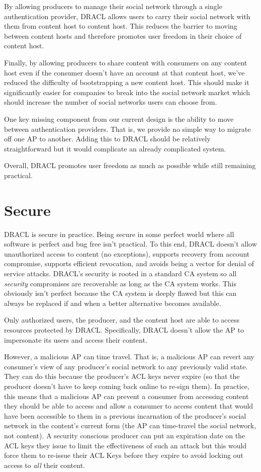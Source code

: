 \documentclass[pdftex,12pt,a4papaer,twoside,notitlepage]{report}
\begin{document}
By allowing producers to manage their social network through a single
authentication provider, DRACL allows users to carry their social network with
them from content host to content host. This reduces the barrier to moving
between content hosts and therefore promotes user freedom in their choice of
content host.

Finally, by allowing producers to share content with consumers on any content
host even if the consumer doesn't have an account at that content host, we've
reduced the difficulty of bootstrapping a new content host. This should make it
significantly easier for companies to break into the social network market which
should increase the number of social networks users can choose from.

One key missing component from our current design is the ability to move between
authentication providers. That is, we provide no simple way to migrate off one
AP to another. Adding this to DRACL should be relatively straightforward but it
would complicate an already complicated system.

Overall, DRACL promotes user freedom as much as possible while still remaining
practical.

\section{Secure}
\label{sec:secure}

DRACL is secure in practice. Being secure in some perfect world where all
software is perfect and bug free isn't practical. To this end, DRACL doesn't
allow unauthorized access to content (no exceptions), supports recovery from
account compromise, supports efficient revocation, and avoids being a vector for
denial of service attacks. DRACL's security is rooted in a standard CA system so
all \emph{security} compromises are recoverable as long as the CA system works.
This obviously isn't perfect because the CA system is deeply flawed but this can
always be replaced if and when a better alternative becomes available.

Only authorized users, the producer, and the content host are able to access
resources protected by DRACL\@. Specifically, DRACL doesn't allow the AP to
impersonate its users and access their content.

However, a malicious AP can time travel. That is, a malicious AP can revert any
consumer's view of any producer's social network to any previously valid state.
They can do this because the producer's ACL keys never expire (so that the
producer doesn't have to keep coming back online to re-sign them). In practice,
this means that a malicious AP can prevent a consumer from accessing content
they should be able to access and allow a consumer to access content that would
have been accessible to them in a previous incarnation of the producer's social
network in the content's current form (the AP can time-travel the social network,
not content). A security conscious producer can put an expiration date on
the ACL keys they issue to limit the effectiveness of such an attack but this
would force them to re-issue their ACL Keys before they expire to avoid locking
out access to \emph{all} their content.
\end{document}

